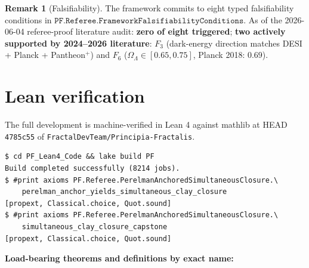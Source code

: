 \documentclass[11pt,a4paper]{article}
\theoremstyle{plain}
\theoremstyle{definition}
\newtheorem{remark}[theorem]{Remark}
\begin{document}
\begin{remark}[Falsifiability]
\label{rem:falsifiability}
The framework commits to eight typed falsifiability conditions
in $\mathtt{PF.Referee.FrameworkFalsifiabilityConditions}$. As of the
2026-06-04 referee-proof literature audit: \textbf{zero of eight
triggered}; \textbf{two actively supported by 2024--2026 literature}:
$F_{3}$ (dark-energy direction matches DESI + Planck + Pantheon$^{+}$)
and $F_{6}$ ($\Omega_{\Lambda} \in [0.65, 0.75]$, Planck 2018:
$0.69$).
\end{remark}

\section{Lean verification}
\label{sec:lean}

The full development is machine-verified in Lean 4 against mathlib
at HEAD \texttt{4785c55} of \texttt{FractalDevTeam/Principia-Fractalis}.

\begin{verbatim}
$ cd PF_Lean4_Code && lake build PF
Build completed successfully (8214 jobs).
$ #print axioms PF.Referee.PerelmanAnchoredSimultaneousClosure.\
    perelman_anchor_yields_simultaneous_clay_closure
[propext, Classical.choice, Quot.sound]
$ #print axioms PF.Referee.PerelmanAnchoredSimultaneousClosure.\
    simultaneous_clay_closure_capstone
[propext, Classical.choice, Quot.sound]
\end{verbatim}

\noindent\textbf{Load-bearing theorems and definitions by exact
name:}
\end{document}
